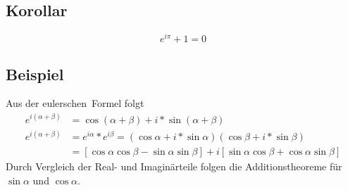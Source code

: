 \subsection{Korollar}
\[e^{i\pi}+1=0\]

\subsection{Beispiel}
Aus der eulerschen Formel folgt
\begin{align}
e^{i(\alpha+\beta)} &= \cos{(\alpha+\beta)}+i*\sin{(\alpha+\beta)} \\
e^{i(\alpha+\beta)} &= e^{i\alpha} * e^{i\beta}=(\cos{\alpha}+i*\sin{\alpha})(\cos{\beta}+i*\sin{\beta}) \\
&= \left[ \cos{\alpha}\cos{\beta}-\sin{\alpha}\sin{\beta} \right] + i \left[ \sin{\alpha}\cos{\beta}+\cos{\alpha}\sin{\beta} \right]
\end{align}
Durch Vergleich der Real- und Imaginärteile folgen die Additionstheoreme für $\sin{\alpha}$ und $\cos{\alpha}$.
